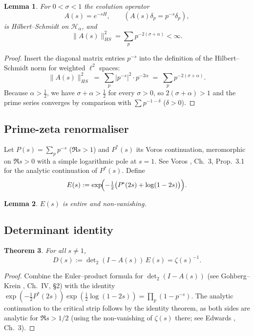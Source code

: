 \documentclass[12pt]{article}
\newtheorem{theorem}{Theorem}[section]
\newtheorem{lemma}[theorem]{Lemma}
\theoremstyle{definition}
\theoremstyle{remark}
\newcommand{\Hspace}{\mathcal H}
\newcommand{\Zeta}{\zeta}
\begin{document}
\begin{lemma}\label{lem:HS}
For $0<\sigma<1$ the evolution operator
\[
   A(s)=e^{-sH}, \qquad (A(s)\delta_p = p^{-s}\delta_p),
\]
is Hilbert--Schmidt on $\Hspace_{\alpha}$, and
\[
   \|A(s)\|_{HS}^{2}
   = \sum_{p} p^{-2(\sigma+\alpha)}<\infty.
\]
\end{lemma}

\begin{proof}
Insert the diagonal matrix entries $p^{-s}$ into the definition of the
Hilbert--Schmidt norm for weighted $\ell^{2}$ spaces:
\[
   \|A(s)\|_{HS}^{2}
   \;=\;\sum_{p} |p^{-s}|^{2}\cdot p^{-2\alpha}
   \;=\;\sum_{p} p^{-2(\sigma+\alpha)}.
\]
Because $\alpha>\tfrac12$, we have $\sigma+\alpha>\tfrac12$ for every $\sigma>0$,
so $2(\sigma+\alpha)>1$ and the prime series converges by comparison with
$\sum p^{-1-\delta}$ ($\delta>0$).
\end{proof}

\subsection{Prime-zeta renormaliser}
Let
\(P(s)=\sum_{p}p^{-s}\) (\(\Re s>1\)) and
\(P^{\!*}(s)\) its Voros continuation, meromorphic on \(\Re s>0\)
with a simple logarithmic pole at \(s=1\).
See Voros \cite{voros}, Ch.~3, Prop.~3.1 for the analytic continuation of \(P^{\!*}(s)\).
Define
\[
   E(s):=\exp\!\Bigl(-\tfrac12\bigl(P^{\!*}(2s)+\log(1-2s)\bigr)\Bigr).
\]
\begin{lemma}
\(E(s)\) is entire and non-vanishing.
\end{lemma}

\subsection{Determinant identity}

\begin{theorem}\label{thm:det}
For all \(s\ne1\),
\[
   D(s):=\det\nolimits_{2}(I-A(s))\,E(s)=\Zeta(s)^{-1}.
\]
\end{theorem}

\begin{proof}
Combine the Euler--product formula for \(\det_{2}(I-A(s))\)
(see Gohberg--Krein \cite{gohberg-krein}, Ch.~IV, \S2)
with the identity
\(\exp(-\tfrac12P^{\!*}(2s))\exp(\tfrac12\log(1-2s))=
  \prod_{p}(1-p^{-s})\).
The analytic continuation to the critical strip follows by
the identity theorem, as both sides are analytic for \(\Re s > 1/2\)
(using the non-vanishing of \(\zeta(s)\) there; see Edwards \cite{edwards}, Ch.~3).
\end{proof}
\end{document}
